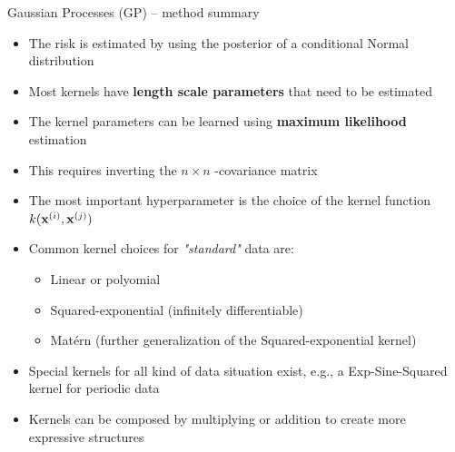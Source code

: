 \begin{frame}{Gaussian Processes (GP) -- method summary}
    
    \begin{itemize}
        \item The risk is estimated by using the posterior of a conditional Normal distribution
        \item Most kernels have \textbf{length scale parameters} that need to be estimated
    \end{itemize}
    \begin{itemize}
        \item The kernel parameters can be learned using \textbf{maximum likelihood} estimation
        \item This requires inverting the $n\times n$ -covariance matrix
    \end{itemize}
    \begin{itemize}
        \item The most important hyperparameter is the choice of the kernel function $k(\mathbf{x}^{(i)}, \mathbf{x}^{(j)})$
        \item Common kernel choices for \textit{"standard"} data are:
        \begin{itemize}
            \item Linear or polyomial
            \item Squared-exponential (infinitely differentiable)
            \item Matérn (further generalization of the Squared-exponential kernel)
        \end{itemize}
        \item Special kernels for all kind of data situation exist, e.g., a Exp-Sine-Squared kernel for periodic data
        \item Kernels can be composed by multiplying or addition to create more expressive structures
    \end{itemize}
    
\end{frame}

